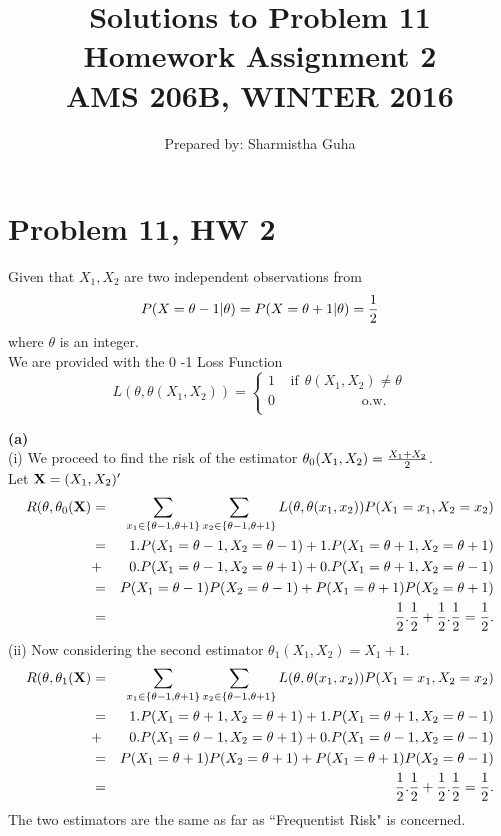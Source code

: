 \documentclass[12pt]{article}
\def\frac#1#2{{{#1}\over{#2}}}
\def\X   {\hbox{\bf X}}
\begin{document}
\title{Solutions to Problem 11\\
Homework Assignment 2 \\
{\small {\bf AMS 206B, WINTER 2016 }} \\
}

\author{Prepared by: Sharmistha Guha}

\maketitle

\section*{Problem 11, HW 2}
Given that $X_1, X_2$ are two independent observations from
\begin{equation}
P(X=\theta-1|\theta)=P(X=\theta+1|\theta)=\frac{1}{2}
\end{equation}
where $\theta$ is an integer. \\
We are provided with the 0 -1 Loss Function
$$
L(\theta,\theta(X_1,X_2))=\left\{\begin{array}{c}
1\:\:\:\:\:\mbox{if}\:\:\theta(X_1,X_2)\neq \theta\\
0\:\:\:\:\:\:\:\:\:\:\:\:\:\:\:\:\:\:\:\:\:\:\:\:\:\:\:\:\mbox{o.w.}\\
\end{array}
\right.
$$

\textbf{(a)} \\(i) We proceed to find the risk of the estimator $\theta_0(X_1,X_2)=\frac{X_1+X_2}{2}$. \\
Let $\X=(X_1,X_2)'$
\begin{eqnarray}
R(\theta,\theta_0(\X) &=& \sum_{x_1\in\{\theta-1,\theta+1\}}\sum_{x_2\in\{\theta-1,\theta+1\}}L(\theta,\theta(x_1,x_2))P(X_1=x_1,X_2=x_2)\nonumber\\
&=& 1. P(X_1=\theta-1,X_2=\theta-1)+1.P(X_1=\theta+1,X_2=\theta+1)\nonumber\\
&+& 0.P(X_1=\theta-1,X_2=\theta+1)+0.P(X_1=\theta+1,X_2=\theta-1)\nonumber\\
&=& P(X_1=\theta-1)P(X_2=\theta-1)+P(X_1=\theta+1)P(X_2=\theta+1)\nonumber\\
&=& \frac{1}{2}.\frac{1}{2}+\frac{1}{2}.\frac{1}{2}=\frac{1}{2}.
\end{eqnarray}
(ii) Now considering the second estimator $\theta_1(X_1,X_2)=X_1+1$.
\begin{eqnarray}
R(\theta,\theta_1(\X) &=& \sum_{x_1\in\{\theta-1,\theta+1\}}\sum_{x_2\in\{\theta-1,\theta+1\}}L(\theta,\theta(x_1,x_2))P(X_1=x_1,X_2=x_2)\nonumber\\
&=& 1. P(X_1=\theta+1,X_2=\theta+1)+1.P(X_1=\theta+1,X_2=\theta-1)\nonumber\\
&+& 0.P(X_1=\theta-1,X_2=\theta+1)+0.P(X_1=\theta-1,X_2=\theta-1)\nonumber\\
&=& P(X_1=\theta+1)P(X_2=\theta+1)+P(X_1=\theta+1)P(X_2=\theta-1)\nonumber\\
&=& \frac{1}{2}.\frac{1}{2}+\frac{1}{2}.\frac{1}{2}=\frac{1}{2}.
\end{eqnarray}
The two estimators are the same as far as ``Frequentist Risk" is concerned.\\
\end{document}
